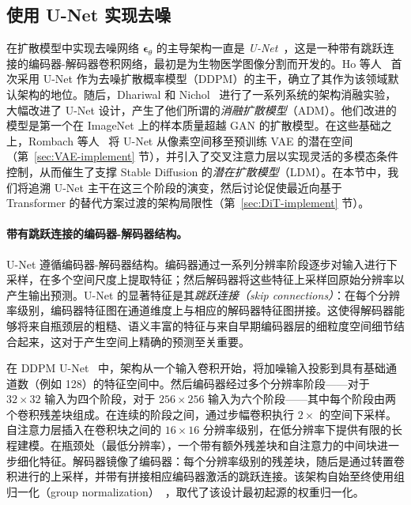 \documentclass[../../book-main_zh.tex]{subfiles}
\begin{document}
\subsection{使用 U-Net 实现去噪}
\label{sec:UNet-implement}

在扩散模型中实现去噪网络 $\boldsymbol{\epsilon}_\theta$ 的主导架构一直是 \textit{U-Net}~\citep{ronneberger2015unet}，这是一种带有跳跃连接的编码器-解码器卷积网络，最初是为生物医学图像分割而开发的。Ho 等人~\citep{ho2020denoising} 首次采用 U-Net 作为去噪扩散概率模型（DDPM）的主干，确立了其作为该领域默认架构的地位。随后，Dhariwal 和 Nichol~\citep{dhariwal2021diffusion} 进行了一系列系统的架构消融实验，大幅改进了 U-Net 设计，产生了他们所谓的\emph{消融扩散模型}（ADM）。他们改进的模型是第一个在 ImageNet 上的样本质量超越 GAN 的扩散模型。在这些基础之上，Rombach 等人~\citep{rombach2022high} 将 U-Net 从像素空间移至预训练 VAE 的潜在空间（第~\ref{sec:VAE-implement} 节），并引入了交叉注意力层以实现灵活的多模态条件控制，从而催生了支撑 Stable Diffusion 的\emph{潜在扩散模型}（LDM）。在本节中，我们将追溯 U-Net 主干在这三个阶段的演变，然后讨论促使最近向基于 Transformer 的替代方案过渡的架构局限性（第~\ref{sec:DiT-implement} 节）。

\paragraph{带有跳跃连接的编码器-解码器结构。}
U-Net 遵循编码器-解码器结构。编码器通过一系列分辨率阶段逐步对输入进行下采样，在多个空间尺度上提取特征；然后解码器将这些特征上采样回原始分辨率以产生输出预测。U-Net 的显著特征是其\emph{跳跃连接（skip connections）}：在每个分辨率级别，编码器特征图在通道维度上与相应的解码器特征图拼接。这使得解码器能够将来自瓶颈层的粗糙、语义丰富的特征与来自早期编码器层的细粒度空间细节结合起来，这对于产生空间上精确的预测至关重要。

在 DDPM U-Net~\citep{ho2020denoising} 中，架构从一个输入卷积开始，将加噪输入投影到具有基础通道数（例如 128）的特征空间中。然后编码器经过多个分辨率阶段——对于 $32 \times 32$ 输入为四个阶段，对于 $256 \times 256$ 输入为六个阶段——其中每个阶段由两个卷积残差块组成。在连续的阶段之间，通过步幅卷积执行 $2\times$ 的空间下采样。自注意力层插入在卷积块之间的 $16 \times 16$ 分辨率级别，在低分辨率下提供有限的长程建模。在瓶颈处（最低分辨率），一个带有额外残差块和自注意力的中间块进一步细化特征。解码器镜像了编码器：每个分辨率级别的残差块，随后是通过转置卷积进行的上采样，并带有拼接相应编码器激活的跳跃连接。该架构自始至终使用组归一化（group normalization）~\citep{wu2018group}，取代了该设计最初起源的权重归一化。
\end{document}
